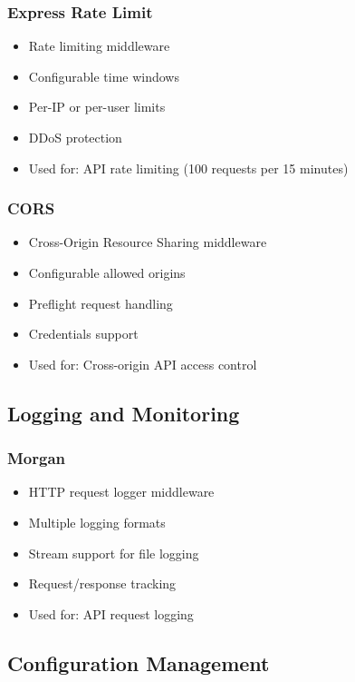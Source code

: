 \subsubsection{Express Rate Limit}
\begin{itemize}[leftmargin=*]
    \item Rate limiting middleware
    \item Configurable time windows
    \item Per-IP or per-user limits
    \item DDoS protection
    \item Used for: API rate limiting (100 requests per 15 minutes)
\end{itemize}

\subsubsection{CORS}
\begin{itemize}[leftmargin=*]
    \item Cross-Origin Resource Sharing middleware
    \item Configurable allowed origins
    \item Preflight request handling
    \item Credentials support
    \item Used for: Cross-origin API access control
\end{itemize}

\subsection{Logging and Monitoring}

\subsubsection{Morgan}
\begin{itemize}[leftmargin=*]
    \item HTTP request logger middleware
    \item Multiple logging formats
    \item Stream support for file logging
    \item Request/response tracking
    \item Used for: API request logging
\end{itemize}

\subsection{Configuration Management}

